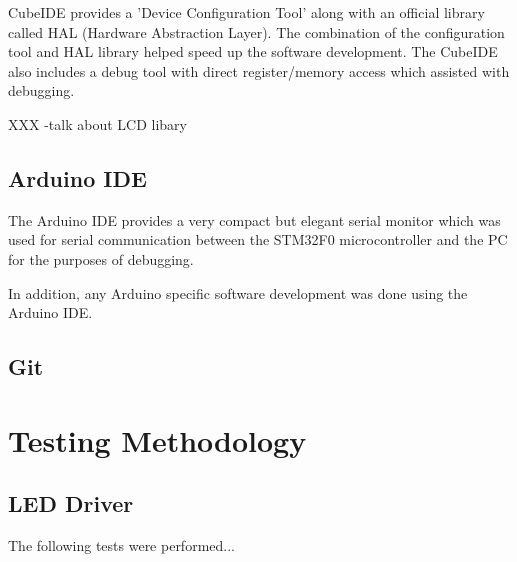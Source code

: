 CubeIDE provides a 'Device Configuration Tool' along with an official library called HAL (Hardware Abstraction Layer). The combination of the configuration tool and HAL library helped speed up the software development. The CubeIDE also includes a debug tool with direct register/memory access which assisted with debugging.

XXX -talk about LCD libary

\subsection{Arduino IDE}
The Arduino IDE provides a very compact but elegant serial monitor which was used for serial communication between the STM32F0 microcontroller and the PC for the purposes of debugging.

In addition, any Arduino specific software development was done using the Arduino IDE.

\subsection{Git}




\section{Testing Methodology}

\subsection{LED Driver}
The following tests were performed...


